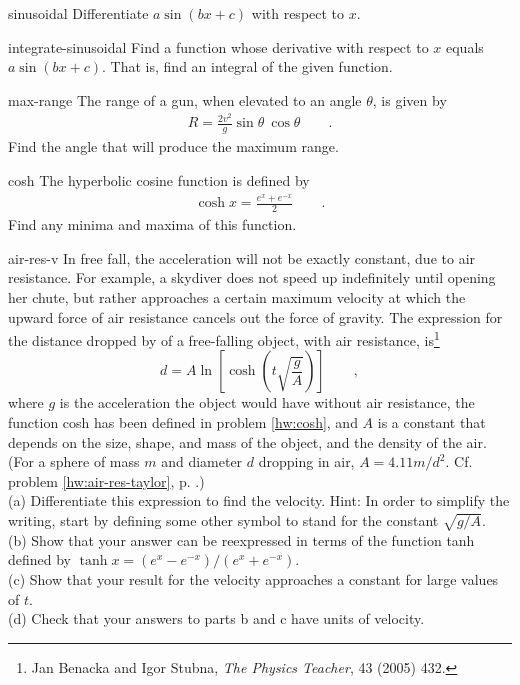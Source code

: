\begin{hwsection}
\begin{hwwithsoln}{sinusoidal}
Differentiate $a\sin(bx+c)$ with respect to $x$.
\end{hwwithsoln}

\begin{hwwithsoln}{integrate-sinusoidal}
Find a function whose derivative with respect to $x$ equals $a\sin(bx+c)$. That is, find an
integral of the given function.
\end{hwwithsoln}

\begin{hwwithsoln}{max-range}
The range of a gun, when elevated to an angle $\theta$, is given by
\begin{align*}
  R=\frac{2v^2}{g}\sin\theta\:\cos\theta \qquad .
\end{align*}
Find the angle that will produce the maximum range.
\end{hwwithsoln}

\begin{hwwithsoln}{cosh}
The hyperbolic cosine function is defined by
\begin{align*}
  \cosh x = \frac{e^x+e^{-x}}{2} \qquad .
\end{align*}
Find any minima and maxima of this function.
\end{hwwithsoln}

\begin{hwwithsoln}{air-res-v}
In free fall, the acceleration will not be exactly constant, due to air resistance. For example,
a skydiver does not speed up indefinitely until opening her chute, but rather approaches a certain
maximum velocity at which the upward force of air resistance cancels out the force of gravity.
The expression for the distance dropped by of a free-falling object, with air resistance, is\footnote{Jan Benacka
and Igor Stubna, \emph{The Physics Teacher}, 43 (2005) 432.}
\begin{equation*}
  d = A \ln\left[\cosh\left(t\sqrt{\frac{g}{A}}\right)\right] \qquad ,
\end{equation*}
where $g$ is the acceleration the object would have without air resistance, the function cosh
has been defined in problem \ref{hw:cosh}, and
$A$ is a constant that depends on the size, shape, and mass of the object, and the density of
the air. (For a sphere of mass $m$ and diameter $d$ dropping in air, $A=4.11m/d^2$.
Cf. problem \ref{hw:air-res-taylor}, p. \pageref{hw:air-res-taylor}.)\\
(a) Differentiate this expression to find the velocity.  Hint: In order to simplify the writing,
start by defining some other symbol to stand for the constant $\sqrt{g/A}$.\\
(b) Show that your answer can be reexpressed in terms of the function tanh defined by
$\tanh x=(e^x-e^{-x})/(e^x+e^{-x})$.\\
(c) Show that your result for the velocity approaches
a constant for large values of $t$.\\
(d) Check that your answers to parts b and c have units of velocity.
\end{hwwithsoln}


\end{hwsection}
